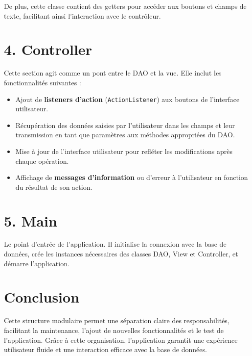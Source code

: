 \documentclass[a4paper,12pt]{report}
\begin{document}
De plus, cette classe contient des getters pour accéder aux boutons et champs de texte, facilitant ainsi l'interaction avec le contrôleur.

\section*{\textcolor{myblue}{4. Controller}}

Cette section agit comme un pont entre le DAO et la vue. Elle inclut les fonctionnalités suivantes :
\begin{itemize}
    \item Ajout de \textbf{listeners d'action} (\texttt{ActionListener}) aux boutons de l'interface utilisateur.
    \item Récupération des données saisies par l'utilisateur dans les champs et leur transmission en tant que paramètres aux méthodes appropriées du DAO.
    \item Mise à jour de l'interface utilisateur pour refléter les modifications après chaque opération.
    \item Affichage de \textbf{messages d'information} ou d'erreur à l'utilisateur en fonction du résultat de son action.
\end{itemize}

\section*{\textcolor{myblue}{5. Main}}

Le point d'entrée de l'application. Il initialise la connexion avec la base de données, crée les instances nécessaires des classes DAO, View et Controller, et démarre l'application.

\section*{\textcolor{myblue}{Conclusion}}

Cette structure modulaire permet une séparation claire des responsabilités, facilitant la maintenance, l'ajout de nouvelles fonctionnalités et le test de l'application. Grâce à cette organisation, l'application garantit une expérience utilisateur fluide et une interaction efficace avec la base de données.
\end{document}
